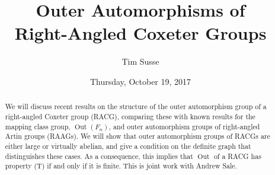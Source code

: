 \documentclass{UAmathtalk}
\author{Tim Susse}
\title{Outer Automorphisms of\\ Right-Angled Coxeter Groups}
\date{Thursday, October 19, 2017}
\begin{document}
\maketitle

\begin{abstract}
We will discuss recent results on the structure of the outer automorphism group of a right-angled Coxeter group (RACG), comparing these with known results for the mapping class group, $\operatorname{Out}(F_n)$, and outer automorphism groups of right-angled Artin groups (RAAGs). We will show that outer automorphism groups of RACGs are either large or virtually abelian, and give a condition on the definite graph that distinguishes these cases. As a consequence, this implies that $\operatorname{Out}$ of a RACG has property (T) if and only if it is finite. This is joint work with Andrew Sale.
\end{abstract}
\end{document}
